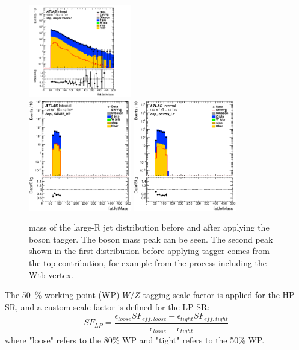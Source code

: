 \begin{figure}[H]
    \centering
    \includegraphics[width=0.4\textwidth]{figures/2lep/dataMC/C_0ptag1pfat0pjet_0ptv_MergedCommon_fatJetMass_Log} \\
    \includegraphics[width=0.4\textwidth]{figures/2lep/dataMC/C_0ptag1pfat0pjet_0ptv_SRVBS_HP_fatJetMass_Log} 
    \includegraphics[width=0.4\textwidth]{figures/2lep/dataMC/C_0ptag1pfat0pjet_0ptv_SRVBS_LP_fatJetMass_Log}
    \caption{mass of the large-R jet distribution before and after applying the boson tagger. The boson mass peak can be seen. The second peak shown in the first distribution before applying tagger comes from the top contribution, for example from the process including the Wtb vertex.}
    \label{fig:2lepfatJet}
\end{figure}

The 50~\% working point (WP) $W/Z$-tagging scale factor is applied for the HP SR, and a custom scale factor is defined for the LP SR:
\begin{equation}
S F_{L P}=\frac{\epsilon_{loose} S F_{eff, loose}-\epsilon_{tight} S F_{eff, tight}}{\epsilon_{loose}-\epsilon_{tight}}
\end{equation}
where "loose" refers to the 80\% WP and "tight" refers to the 50\% WP.

